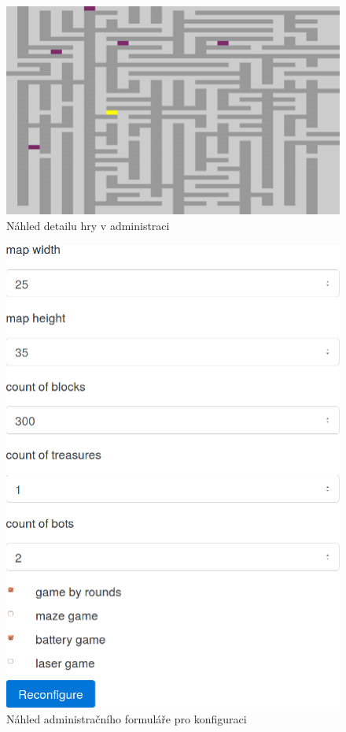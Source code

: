 \begin{figure}[H]
	\centering
	\includegraphics{assets/admin-game-detail}
	\caption{Náhled detailu hry v administraci}
	\label{fig:admin-game-detail}
\end{figure}

\begin{figure}[H]
	\centering
	\includegraphics{assets/admin-conf-form}
	\caption{Náhled administračního formuláře pro konfiguraci}
	\label{fig:admin-conf-form}
\end{figure}
